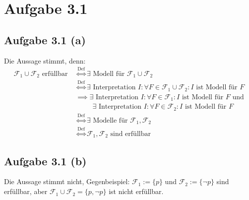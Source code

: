 \documentclass[12pt,a4paper]{article}
\author{Willi Sontopski}
\newcommand{\F}{\mathcal{F}}
\begin{document}

\section*{Aufgabe 3.1}
\subsection*{Aufgabe 3.1 (a)}
Die Aussage stimmt, denn:
\begin{align*}
\F_1\cup\F_2\text{ erfüllbar }
&\stackrel{\text{Def}}{\Longleftrightarrow}
\exists\text{ Modell für }\F_1\cup\F_2\\
&\stackrel{\text{Def}}{\Longleftrightarrow}
\exists\text{ Interpretation }I:\forall F\in\F_1\cup\F_2:I\text{ ist Modell für }F\\
&\implies
\exists\text{ Interpretation }I:\forall F\in\F_1:I\text{ ist Modell für }F\text{ und}\\
&\qquad~~\exists\text{ Interpretation }I:\forall F\in\F_2:I\text{ ist Modell für }F\\
&\stackrel{\text{Def}}{\Longleftrightarrow}
\exists\text{ Modelle für }\F_1,\F_2\\
&\stackrel{\text{Def}}{\Longleftrightarrow}
\F_1,\F_2\text{ sind erfüllbar}
\end{align*}

\subsection*{Aufgabe 3.1 (b)}
Die Aussage stimmt nicht, Gegenbeispiel:
$\F_1:=\lbrace p\rbrace$ und $\F_2:=\lbrace\neg p\rbrace$ sind erfüllbar, aber $\F_1\cup\F_2=\lbrace p ,\neg p\rbrace$ ist nicht erfüllbar.\\

\end{document}
